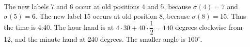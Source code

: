 The new labels 7 and 6 occur at old positions 4 and 5, because $\sigma(4)=7$ and $\sigma(5)=6$. The new label 15 occurs at old position 8, because $\sigma(8)=15$. Thus the time is 4:40. The hour hand is at $4\cdot30+40\cdot\dfrac{1}{2}=140$ degrees clockwise from 12, and the minute hand at 240 degrees. The smaller angle is $\boxed{100^\circ}$.
